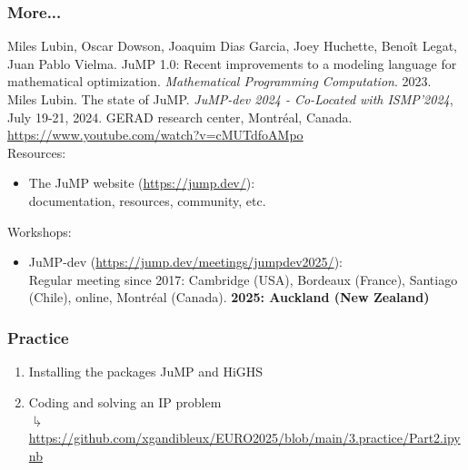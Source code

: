 \documentclass[]{beamer}
\newcommand*{\blue}[1]{\textcolor{nblue}{#1}}
\begin{document}
%
%
\begin{frame}
  \frametitle{More...}
\vspace{3mm}

{\footnotesize

 Miles Lubin, Oscar Dowson, Joaquim {Dias Garcia}, Joey Huchette, Beno{\^i}t Legat, Juan Pablo Vielma.
{JuMP} 1.0: {R}ecent improvements to a modeling language for mathematical optimization.
\textit{Mathematical Programming Computation}. 2023.\vspace{5mm}\\

Miles Lubin. 
The state of JuMP. 
\textit{JuMP-dev 2024 - Co-Located with ISMP'2024}, July 19-21, 2024. GERAD research center, Montréal, Canada.\\
\url{https://www.youtube.com/watch?v=cMUTdfoAMpo} \vspace{5mm}\\


Resources:\\
\begin{itemize}
\item[] \blue{The JuMP website} (\url{https://jump.dev/}):\\
documentation, resources, community, etc. \vspace{4mm}
\end{itemize}

Workshops:\\
\begin{itemize}
\item[] \blue{JuMP-dev} (\url{https://jump.dev/meetings/jumpdev2025/}): \\
Regular meeting since 2017: Cambridge (USA), Bordeaux (France), Santiago (Chile), online, Montréal (Canada). \textbf{2025: Auckland (New Zealand)} %
\end{itemize}
}
   
\end{frame}

% 
%

\begin{frame}
  \frametitle{Practice}
\vspace{3mm}

\begin{enumerate}
\item Installing the packages JuMP and HiGHS

\item Coding and solving an IP problem \\
$\drsh$ \tiny{\url{https://github.com/xgandibleux/EURO2025/blob/main/3.practice/Part2.ipynb}}
\vspace{3mm}

\end{enumerate}

\end{frame}
\end{document}
